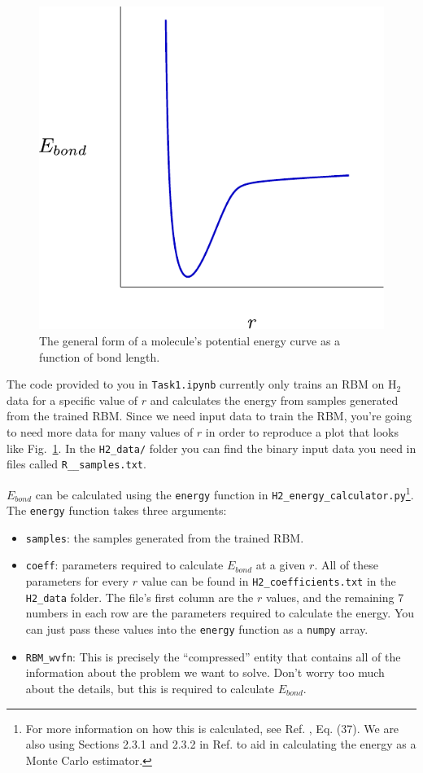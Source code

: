 \documentclass[12pt]{article}
\begin{document}
\begin{figure}
    \begin{center}
        \includegraphics[width=0.4\linewidth]{../figures/potential_energy_curve_vanilla.pdf}
    \end{center}
    \caption{The general form of a molecule's potential energy curve as a function of bond length.}
    \label{fig:potential_curve}
\end{figure}

The code provided to you in \texttt{Task1.ipynb} currently only trains an RBM on H$_2$ data for a specific value of $r$ and calculates the energy from samples generated from the trained RBM. Since we need input data to train the RBM, you're going to need more data for many values of $r$ in order to reproduce a plot that looks like Fig.~\ref{fig:potential_curve}. In the \texttt{H2\_data/} folder you can find the binary input data you need in files called \texttt{R\_<r value>\_samples.txt}. 

$E_{bond}$ can be calculated using the \texttt{energy} function in \texttt{H2\_energy\_calculator.py}\footnote{For more information on how this is calculated, see Ref.      \cite{xiaElectronicStructureCalculations2017}, Eq. (37). We are also using Sections 2.3.1 and 2.3.2 in Ref. \cite{beachQuCumberWavefunctionReconstruction2019} to aid in calculating the energy as a Monte Carlo estimator.}. The \texttt{energy} function takes three arguments: 

\begin{itemize}
    \item \texttt{samples}: the samples generated from the trained RBM.
    \item \texttt{coeff}: parameters required to calculate $E_{bond}$ at a given $r$. All of these parameters for every $r$ value can be found in \texttt{H2\_coefficients.txt} in the \texttt{H2\_data} folder. The file's first column are the $r$ values, and the remaining 7 numbers in each row are the parameters required to calculate the energy. You can just pass these values into the \texttt{energy} function as a \texttt{numpy} array. 
    \item \texttt{RBM\_wvfn}: This is precisely the ``compressed'' entity that contains all of the information about the problem we want to solve. Don't worry too much about the details, but this is required to calculate $E_{bond}$.
\end{itemize}
\end{document}
